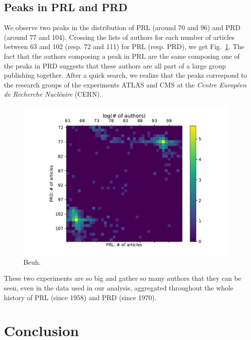 \documentclass[aps,prl,floatfix,twocolumn]{revtex4-1}
\begin{document}
\subsection{Peaks in PRL and PRD}
We observe two peaks in the distribution of PRL (around 70 and 96) and PRD (around 77 and 104). 
Crossing the lists of authors for each number of articles between 63 and 102 (resp. 72 and 111) for PRL (resp. PRD), we get Fig.~\ref{fig:prl_prd}. 
The fact that the authors composing a peak in PRL are the same composing one of the peaks in PRD suggests that these authors are all part of a large group publishing together. 
After a quick search, we realize that the peaks correspond to the research groups of the experiments ATLAS and CMS at the  \emph{Centre Europ\'een de Recherche Nucl\'eaire} (CERN). 
\begin{figure}
 \centering
 \includegraphics[width=.8\columnwidth]{figures/prl_prd_log.pdf}
 \caption{Beuh.}
 \label{fig:prl_prd}
\end{figure}
These two experiments are so big and gather so many authors that they can be seen, even in the data used in our analysis, aggregated throughout the whole history of PRL (since 1958) and PRD (since 1970). 

\section{Conclusion}




\end{document}
